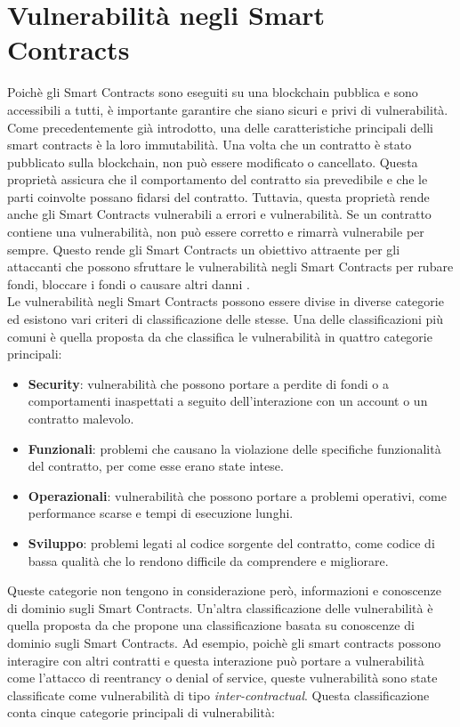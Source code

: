 \documentclass[../../Thesis.tex]{subfiles}
\begin{document}
\section{Vulnerabilità negli Smart Contracts}
Poichè gli Smart Contracts sono eseguiti su una blockchain pubblica e sono accessibili a tutti, è importante garantire che siano sicuri e privi di vulnerabilità. Come precedentemente già introdotto, una delle caratteristiche principali delli smart contracts è la loro immutabilità. Una volta che un contratto è stato pubblicato sulla blockchain, non può essere modificato o cancellato. Questa proprietà assicura che il comportamento del contratto sia prevedibile e che le parti coinvolte possano fidarsi del contratto. Tuttavia, questa proprietà rende anche gli Smart Contracts vulnerabili a errori e vulnerabilità. Se un contratto contiene una vulnerabilità, non può essere corretto e rimarrà vulnerabile per sempre. Questo rende gli Smart Contracts un obiettivo attraente per gli attaccanti che possono sfruttare le vulnerabilità negli Smart Contracts per rubare fondi, bloccare i fondi o causare altri danni \cite{SCEnhancement}.\\
Le vulnerabilità negli Smart Contracts possono essere divise in diverse categorie ed esistono vari criteri di classificazione delle stesse. Una delle classificazioni più comuni è quella proposta da \cite{SmartCheck} che classifica le vulnerabilità in quattro categorie principali:
\begin{itemize}
    \item \textbf{Security}: vulnerabilità che possono portare a perdite di fondi o a comportamenti inaspettati a seguito dell'interazione con un account o un contratto malevolo.
    \item \textbf{Funzionali}: problemi che causano la violazione delle specifiche funzionalità del contratto, per come esse erano state intese.
    \item \textbf{Operazionali}: vulnerabilità che possono portare a problemi operativi, come performance scarse e tempi di esecuzione lunghi.
    \item \textbf{Sviluppo}: problemi legati al codice sorgente del contratto, come codice di bassa qualità che lo rendono difficile da comprendere e migliorare.
\end{itemize}
Queste categorie non tengono in considerazione però, informazioni e conoscenze di dominio sugli Smart Contracts. Un'altra classificazione delle vulnerabilità è quella proposta da \cite{sc-vulnerabilities} che propone una classificazione basata su conoscenze di dominio sugli Smart Contracts. Ad esempio, poichè gli smart contracts possono interagire con altri contratti e questa interazione può portare a vulnerabilità come l'attacco di reentrancy o denial of service, queste vulnerabilità sono state classificate come vulnerabilità di tipo \emph{inter-contractual}. Questa classificazione conta cinque categorie principali di vulnerabilità: 
\end{document}
